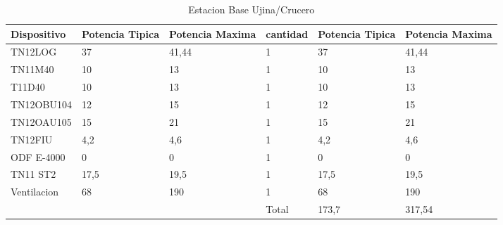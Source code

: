 \begin{table}[]
\begin{tabular}{lll|l|l|l|}
\hline
\multicolumn{1}{|l|}{\textbf{Dispositivo}} & \multicolumn{1}{l|}{\textbf{Potencia Tipica}} & \textbf{Potencia Maxima} & \textbf{cantidad} & \textbf{Potencia Tipica} & \textbf{Potencia Maxima} \\ \hline
\multicolumn{1}{|l|}{TN12LOG} & \multicolumn{1}{l|}{37} & 41,44 & 1 & 37 & 41,44 \\ \hline
\multicolumn{1}{|l|}{TN11M40} & \multicolumn{1}{l|}{10} & 13 & 1 & 10 & 13 \\ \hline
\multicolumn{1}{|l|}{T11D40} & \multicolumn{1}{l|}{10} & 13 & 1 & 10 & 13 \\ \hline
\multicolumn{1}{|l|}{TN12OBU104} & \multicolumn{1}{l|}{12} & 15 & 1 & 12 & 15 \\ \hline
\multicolumn{1}{|l|}{TN12OAU105} & \multicolumn{1}{l|}{15} & 21 & 1 & 15 & 21 \\ \hline
\multicolumn{1}{|l|}{TN12FIU} & \multicolumn{1}{l|}{4,2} & 4,6 & 1 & 4,2 & 4,6 \\ \hline
\multicolumn{1}{|l|}{ODF E-4000} & \multicolumn{1}{l|}{0} & 0 & 1 & 0 & 0 \\ \hline
\multicolumn{1}{|l|}{TN11 ST2} & \multicolumn{1}{l|}{17,5} & 19,5 & 1 & 17,5 & 19,5 \\ \hline
\multicolumn{1}{|l|}{Ventilacion} & \multicolumn{1}{l|}{68} & 190 & 1 & 68 & 190 \\ \hline
 &  &  & Total & 173,7 & 317,54 \\ \cline{4-6} 
\end{tabular}
\caption{Estacion Base Ujina/Crucero}
\label{tab:my-table}
\end{table}